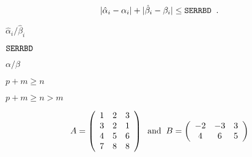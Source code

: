 {\newpage\clearpage
{}%
\begin{displaymath}
| \hat{\alpha}_i - \alpha_i | +
| \hat{\beta}_i - \beta_i |  \leq {\tt SERRBD} \; \; .
\end{displaymath}%
\lthtmldisplayZ
\lthtmlcheckvsize\clearpage}

{\newpage\clearpage
{}%
$\hat{\alpha}_i / \hat{\beta}_i$%
\lthtmlinlinemathZ
\lthtmlcheckvsize\clearpage}

{\newpage\clearpage
{}%
${\tt SERRBD}$%
\lthtmlinlinemathZ
\lthtmlcheckvsize\clearpage}

{\newpage\clearpage
{}%
$\alpha / \beta$%
\lthtmlinlinemathZ
\lthtmlcheckvsize\clearpage}

{\newpage\clearpage
{}%
$p+m \geq n$%
\lthtmlinlinemathZ
\lthtmlcheckvsize\clearpage}

{\newpage\clearpage
{}%
$p+m \geq n > m$%
\lthtmlinlinemathZ
\lthtmlcheckvsize\clearpage}

{\newpage\clearpage
{}%
\begin{displaymath}
A = \left( \begin{array}{ccc} 1 & 2 & 3 \\3 & 2 & 1 \\4 & 5 & 6 \\7 & 8 & 8 \end{array} \right) 
\; \; {\rm and} \; \;
B = \left( \begin{array}{ccc} -2 & -3 & 3 \\4 & 6 & 5 \end{array} \right) 
\end{displaymath}%
\lthtmldisplayZ
\lthtmlcheckvsize\clearpage}

